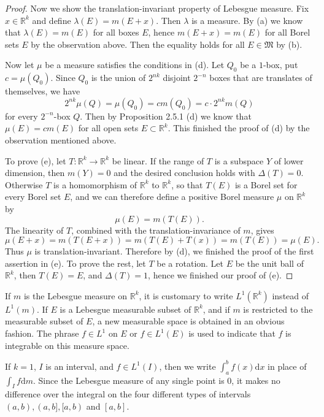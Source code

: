 \begin{proof}
Now we show the translation-invariant property of Lebesgue measure. Fix $x\in\mathbb{R}^k$ and define $\lambda(E)=m(E+x)$. Then $\lambda$ is a measure. By (a) we know that $\lambda(E)=m(E)$ for all boxes $E$, hence $m(E+x)=m(E)$ for all Borel sets $E$ by the observation above. Then the equality holds for all $E\in\mathfrak{M}$ by (b).\par
Now let $\mu$ be a measure satisfies the conditions in (d). Let $Q_0$ be a $1$-box, put $c=\mu(Q_0)$. Since $Q_0$ is the union of $2^{nk}$ disjoint $2^{-n}$ boxes that are translates of themselves, we have 
$$2^{nk}\mu(Q)=\mu(Q_0)=cm(Q_0)=c\cdot2^{nk}m(Q)$$
for every $2^{-n}$-box $Q$. Then by Proposition 2.5.1 (d) we know that $\mu(E)=cm(E)$ for all open sets $E\subset\mathbb{R}^k$. This finished the proof of (d) by the observation mentioned above.\par
To prove (e), let $T:\mathbb{R}^k\to\mathbb{R}^k$ be linear. If the range of $T$ is a subspace $Y$ of lower dimension, then $m(Y)=0$ and the desired conclusion holds with $\Delta(T)=0$. Otherwise $T$ is a homomorphism of $\mathbb{R}^k$ to $\mathbb{R}^k$, so that $T(E)$ is a Borel set for every Borel set $E$, and we can therefore define a positive Borel measure $\mu$ on $\mathbb{R}^k$ by 
$$\mu(E)=m(T(E)).$$
The linearity of $T$, combined with the translation-invariance of $m$, gives 
$$
\mu \left( E+x \right) =m\left( T\left( E+x \right) \right) =m\left( T\left( E \right) +T\left( x \right) \right) =m\left( T\left( E \right) \right) =\mu \left( E \right) .
$$
Thus $\mu$ is translation-invariant. Therefore by (d), we finished the proof of the first assertion in (e). To prove the rest, let $T$ be a rotation. Let $E$ be the unit ball of $\mathbb{R}^k$, then $T(E)=E$, and $\Delta(T)=1$, hence we finished our proof of (e).
\end{proof}
If $m$ is the Lebesgue measure on $\mathbb{R}^k$, it is customary to write $L^1(\mathbb{R}^k)$ instead of $L^1(m)$. If $E$ is a Lebesgue measurable subset of $\mathbb{R}^k$, and if $m$ is restricted to the measurable subset of $E$, a new measurable space is obtained in an obvious fashion. The phrase $f\in L^1$ on $E$ or $f\in L^1(E)$ is used to indicate that $f$ is integrable on this measure space.\par
If $k=1$, $I$ is an interval, and $f\in L^1(I)$, then we write $\int_a^bf(x)\mathrm{d}x$ in place of $\int_If\mathrm{d}m$. Since the Lebesgue measure of any single point is $0$, it makes no difference over the integral on the four different types of intervals $(a,b),(a,b],[a,b)$ and $[a,b]$.\par
